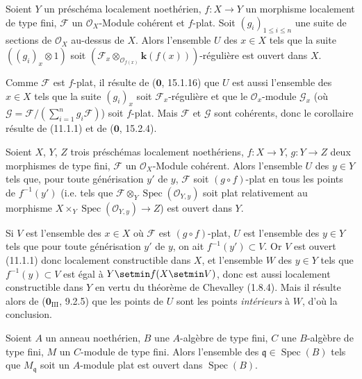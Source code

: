 \begin{corollary}[11.1.4]
\label{IV.11.1.4-fr}
Soient $Y$ un préschéma localement noethérien, $f:X\to Y$ un morphisme
localement de type fini, $\mathcal F$ un $\mathcal O_X$-Module cohérent et
$f$-plat. Soit $(g_i)_{1\leq i\leq n}$ une suite de sections de $\mathcal O_X$
au-dessus de $X$. Alors l'ensemble $U$ des $x\in X$ tels que la suite
$((g_i)_x\otimes1)$ soit
$(\mathcal F_x\otimes_{\mathcal O_{f(x)}}\boldsymbol{k}(f(x)))$-régulière est ouvert dans
$X$.
\end{corollary}

Comme $\mathcal F$ est $f$-plat, il résulte de ($\mathbf 0$, 15.1.16) que $U$
est aussi l'ensemble des $x\in X$
tels que la suite $(g_i)_x$ soit
$\mathcal F_x$-régulière et que le $\mathcal O_x$-module $\mathcal G_x$ (où
$\mathcal G=\mathcal F/(\sum_{i=1}^n g_i\mathcal F)$) soit $f$-plat. Mais
$\mathcal F$ et $\mathcal G$ sont cohérents, donc le corollaire résulte de
(11.1.1) et de ($\mathbf 0$, 15.2.4).

\begin{corollary}[11.1.5]
\label{IV.11.1.5-fr}
Soient $X$, $Y$, $Z$ trois préschémas localement noethériens,
$f:X\to Y$, $g:Y\to Z$ deux morphismes de type fini, $\mathcal F$ un
$\mathcal O_X$-Module cohérent. Alors l'ensemble $U$ des $y\in Y$ tels que,
pour toute générisation $y'$ de $y$, $\mathcal F$ soit $(g\circ f)$-plat en
tous les points de $f^{-1}(y')$ \textup{(i.e.} tels que
$\mathcal F\otimes_Y\operatorname{Spec}(\mathcal O_{Y,y})$ soit plat
relativement au morphisme
$X\times_Y\operatorname{Spec}(\mathcal O_{Y,y})\to Z$\textup{)} est ouvert dans $Y$.
\end{corollary}

Si $V$ est l'ensemble des $x\in X$ où $\mathcal F$ est $(g\circ f)$-plat, $U$
est l'ensemble des $y\in Y$ tels que pour toute générisation $y'$ de $y$, on
ait $f^{-1}(y')\subset V$. Or $V$ est ouvert (11.1.1) donc localement
constructible dans $X$, et l'ensemble $W$ des $y\in Y$ tels que
$f^{-1}(y)\subset V$ est égal à $Y\setmin f(X\setmin V)$, donc est aussi localement
constructible dans $Y$ en vertu du théorème de Chevalley (1.8.4). Mais il
résulte alors de ($\mathbf 0_{\mathrm{III}}$, 9.2.5) que les points de $U$ sont
les points \emph{intérieurs} à $W$, d'où la conclusion.

\begin{corollary}[11.1.6]
\label{IV.11.1.6-fr}
Soient $A$ un anneau noethérien, $B$ une $A$-algèbre de type fini, $C$ une
$B$-algèbre de type fini, $M$ un $C$-module de type fini. Alors l'ensemble des
$\mathfrak q\in\operatorname{Spec}(B)$ tels que $M_{\mathfrak q}$ soit un
$A$-module plat est ouvert dans $\operatorname{Spec}(B)$.
\end{corollary}

